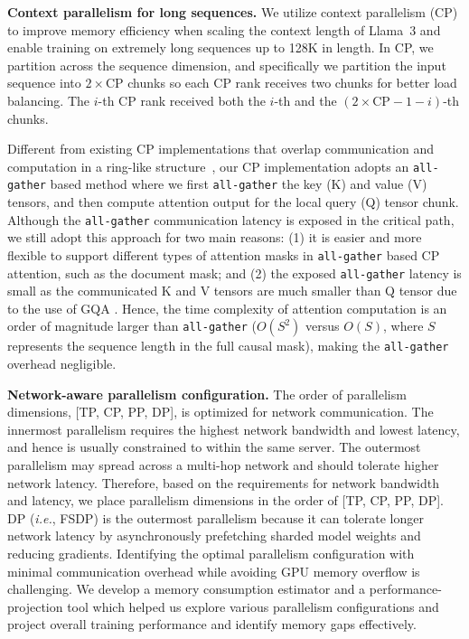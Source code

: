 \textbf{Context parallelism for long sequences.} We utilize context parallelism (CP) to improve memory efficiency when scaling the context length of Llama~3 and enable training on extremely long sequences up to 128K in length. In CP, we partition across the sequence dimension, and specifically we partition the input sequence into $2 \times \mbox{CP}$ chunks so each CP rank receives two chunks for better load balancing. The $i$-th CP rank received both the $i$-th and the $(2 \times \mbox{CP} - 1 - i)$-th chunks. 

Different from existing CP implementations that overlap communication and computation in a ring-like structure~\citep{liu2023ring}, our CP implementation adopts an \texttt{all-gather} based method where we first \texttt{all-gather} the key (K) and value (V) tensors, and then compute attention output for the local query (Q) tensor chunk. Although the \texttt{all-gather} communication latency is exposed in the critical path, we still adopt this approach for two main reasons: (1) it is easier and more flexible to support different types of attention masks in \texttt{all-gather} based CP attention, such as the document mask; and (2) the exposed \texttt{all-gather} latency is small as the communicated K and V tensors are much smaller than Q tensor due to the use of GQA \citep{ainslie2023gqa}. Hence, the time complexity of attention computation is an order of magnitude larger than \texttt{all-gather} ($O(S^2)$ versus $O(S)$, where $S$ represents the sequence length in the full causal mask), making the \texttt{all-gather} overhead negligible.

\textbf{Network-aware parallelism configuration.} The order of parallelism dimensions, [TP, CP, PP, DP], is optimized for network communication. The innermost parallelism requires the highest network bandwidth and lowest latency, and hence is usually constrained to within the same server. The outermost parallelism may spread across a multi-hop network and should tolerate higher network latency. Therefore, based on the requirements for network bandwidth and latency, we place parallelism dimensions in the order of [TP, CP, PP, DP]. DP (\emph{i.e.}, FSDP) is the outermost parallelism because it can tolerate longer network latency by asynchronously prefetching sharded model weights and reducing gradients. Identifying the optimal parallelism configuration with minimal communication overhead while avoiding GPU memory overflow is challenging. We develop a memory consumption estimator and a performance-projection tool which helped us explore various parallelism configurations and project overall training performance and identify memory gaps effectively.

